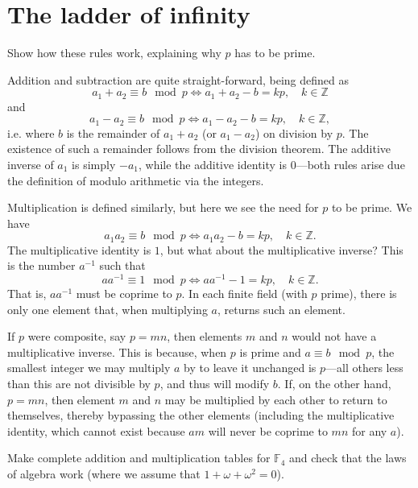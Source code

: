 \documentclass[../the-road-to-reality.tex]{subfiles}
\begin{document}
\section{The ladder of infinity}

\begin{questions}

	\question Show how these rules work, explaining why $p$ has to be prime.

	\begin{solution}
		Addition and subtraction are quite straight-forward, being defined as
		\[
			a_1 + a_2 \equiv b\mod{p} \iff a_1 + a_2 - b = kp, \quad k\in\mathbb{Z}
		\]
		and
		\[
			a_1 - a_2 \equiv b\mod{p} \iff a_1 - a_2 - b = kp, \quad k\in\mathbb{Z},
		\]
		i.e. where $b$ is the remainder of $a_1 + a_2$ (or $a_1 - a_2$) on
		division by $p$. The existence of such a remainder follows from the
		division theorem. The additive inverse of $a_1$ is simply $-a_1$, while
		the additive identity is $0$---both rules arise due the
		definition of modulo arithmetic via the integers.

		Multiplication is defined similarly, but here we see the need for $p$ to
		be prime. We have
		\[
			a_1a_2 \equiv b\mod{p} \iff a_1a_2 - b = kp, \quad k\in\mathbb{Z}.
		\]
		The multiplicative identity is $1$, but what about the
		multiplicative inverse? This is the number $a^{-1}$ such that
		\[
			aa^{-1} \equiv 1\mod{p} \iff aa^{-1} - 1 = kp,\quad k\in\mathbb{Z}.
		\]
		That is, $aa^{-1}$ must be coprime to $p$. In each finite field (with $p$ prime), there is
		only one element that, when multiplying $a$, returns such an element.

		If $p$ were composite, say $p=mn$, then elements $m$ and $n$ would 
		not have a multiplicative inverse. This is because, when $p$ is prime and
		$a \equiv b\mod{p}$, the smallest integer we may multiply $a$ by to leave
		it unchanged is $p$---all others less than this are not divisible by $p$,
		and thus will modify $b$. If, on the other hand, $p = mn$, then element
		$m$ and $n$ may be multiplied by each other to return to themselves,
		thereby bypassing the other elements (including the multiplicative
		identity, which cannot exist because $am$ will never be coprime to $mn$
		for any $a$).
	\end{solution}

	\question Make complete addition and multiplication tables for $\mathbb{F}_4$
	and check that the laws of algebra work (where we assume that $1 + \omega +
	\omega^2 = 0$).


\end{questions}
\end{document}
